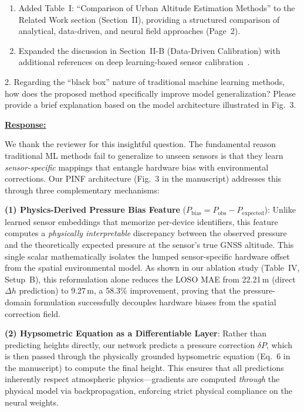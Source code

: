 \begin{enumerate}
    \item Added Table~I: ``Comparison of Urban Altitude Estimation Methods'' to the Related Work section (Section~II), providing a structured comparison of analytical, data-driven, and neural field approaches (Page~2).
    \item Expanded the discussion in Section~II-B (Data-Driven Calibration) with additional references on deep learning-based sensor calibration~\cite{huang2022mems, duan2025accurate}.
\end{enumerate}

\newpage

\begin{cmtone}{}{}
2. Regarding the ``black box'' nature of traditional machine learning methods, how does the proposed method specifically improve model generalization? Please provide a brief explanation based on the model architecture illustrated in Fig.~3.

\end{cmtone}
\vspace{0.1cm}
\noindent
\underline{\textbf{Response:}}
\vspace{0.2cm}

We thank the reviewer for this insightful question. The fundamental reason traditional ML methods fail to generalize to unseen sensors is that they learn \emph{sensor-specific} mappings that entangle hardware bias with environmental corrections. Our PINF architecture (Fig.~3 in the manuscript) addresses this through three complementary mechanisms:

\textbf{(1) Physics-Derived Pressure Bias Feature} ($P_{\text{bias}} = P_{\text{obs}} - P_{\text{expected}}$): Unlike learned sensor embeddings that memorize per-device identifiers, this feature computes a \emph{physically interpretable} discrepancy between the observed pressure and the theoretically expected pressure at the sensor's true GNSS altitude. This single scalar mathematically isolates the lumped sensor-specific hardware offset from the spatial environmental model. As shown in our ablation study (Table~IV, Setup~B), this reformulation alone reduces the LOSO MAE from 22.21\,m (direct $\Delta h$ prediction) to 9.27\,m, a 58.3\% improvement, proving that the pressure-domain formulation successfully decouples hardware biases from the spatial correction field.

\textbf{(2) Hypsometric Equation as a Differentiable Layer}: Rather than predicting heights directly, our network predicts a pressure correction $\delta P$, which is then passed through the physically grounded hypsometric equation (Eq.~6 in the manuscript) to compute the final height. This ensures that all predictions inherently respect atmospheric physics---gradients are computed \emph{through} the physical model via backpropagation, enforcing strict physical compliance on the neural weights.

